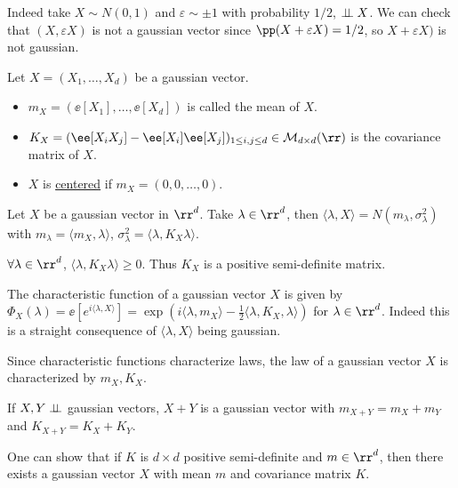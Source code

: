 \documentclass[../main.tex]{subfiles}
\begin{document}
Indeed take $X \sim N(0, 1)$ and $\varepsilon \sim \pm 1$ with probability
$1/2$, $\perp\!\!\!\!\,\perp X$. We can check that $(X, \varepsilon X)$ is not a gaussian
vector since $\pp(X + \varepsilon X) = 1/2$, so $X + \varepsilon X)$ is not
gaussian.

\begin{definition}
  Let $X = (X_1, \ldots, X_d)$ be a gaussian vector.
  \begin{itemize}
    \item $m_X = (\ee[X_1], \ldots, \ee[X_d])$ is called the mean of $X$.
    \item $K_X = (\ee[X_i X_j] - \ee[X_i]\ee[X_j])_{1 \leq i,j \leq d} \in
      \mathcal{M}_{d \times d}(\rr)$ is the covariance matrix of $X$.
    \item $X$ is \underline{centered} if $m_X = (0, 0, \ldots, 0)$.
  \end{itemize}
\end{definition}
\begin{proposition}
    Let $X$ be a gaussian vector in $\rr^d$. Take $\lambda \in \rr^d$, then
    $\langle \lambda, X \rangle = N(m_{\lambda}, \sigma^2_{\lambda})$  with
    $m_{\lambda} = \langle m_X, \lambda \rangle$, $\sigma^2_{\lambda} = \langle
    \lambda, K_X \lambda \rangle$.
\end{proposition}
\begin{corollary}
    $\forall \lambda \in \rr^d$, $\langle \lambda, K_X \lambda \rangle \geq 0$.
    Thus $K_X$ is a positive semi-definite matrix.
\end{corollary}
\begin{corollary}
  The characteristic function of a gaussian vector $X$ is given by
  $\Phi_X(\lambda) = \ee[ e^{i \langle \lambda, X \rangle }] = \exp(i \langle
  \lambda, m_X \rangle - \frac{1}{2} \langle \lambda, K_X, \lambda \rangle)$ for
  $\lambda \in \rr^d$.
  Indeed this is a straight consequence of $\langle \lambda, X \rangle$ being
  gaussian.
\end{corollary}
Since characteristic functions characterize laws, the law of a gaussian vector
$X$ is characterized by $m_X, K_X$.
\begin{application}
    If $X, Y \perp\!\!\!\!\,\perp$ gaussian vectors, $X+Y$ is a gaussian vector with $m_{X +
    Y}= m_X + m_Y$ and $K_{X + Y} = K_X + K_Y$.
\end{application}
\begin{remark}
    One can show that if $K$ is $d \times d$ positive semi-definite and $m \in
    \rr^d$, then there exists a gaussian vector $X$ with mean $m$ and covariance
    matrix $K$.
\end{remark}
\end{document}
